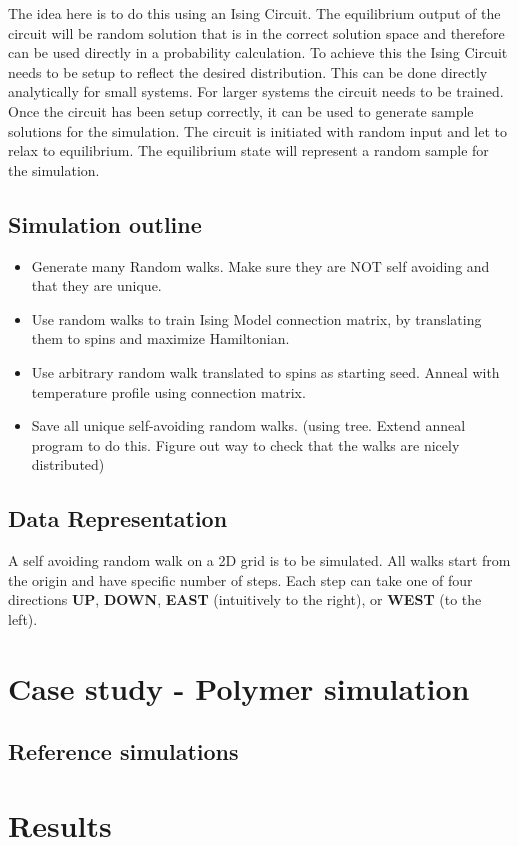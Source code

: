\documentclass[11pt]{article}
\begin{document}
The idea here is to do this using an Ising Circuit. The equilibrium output of the circuit will be random solution that is in the correct solution space and therefore can be used directly in a probability calculation. To achieve this the Ising Circuit needs to be setup to reflect the desired distribution. This can be done directly analytically for small systems. For larger systems the circuit needs to be trained. Once the circuit has been setup correctly, it can be used to generate sample solutions for the simulation. The circuit is initiated with random input and let to relax to equilibrium. The equilibrium state will represent a random sample for the simulation.

\subsection{Simulation outline}
\begin{itemize}
\item Generate many Random walks. Make sure they are NOT self avoiding and that they are unique.
\item Use random walks to train Ising Model connection matrix, by translating them to spins and maximize Hamiltonian.
\item Use arbitrary random walk translated to spins as starting seed. Anneal with temperature profile using connection matrix.
\item Save all unique self-avoiding random walks. (using tree. Extend anneal program to do this. Figure out way to check that the walks are nicely distributed)
\end{itemize}

\subsection{Data Representation}
A self avoiding random walk on a 2D grid is to be simulated. All walks start from the origin and have specific number of steps. Each step can take one of four directions \textbf{UP}, \textbf{DOWN}, \textbf{EAST} (intuitively to the right),  or \textbf{WEST} (to the left).
\section{Case study - Polymer simulation}
\subsection{Reference simulations}


\section{Results}


\end{document}
